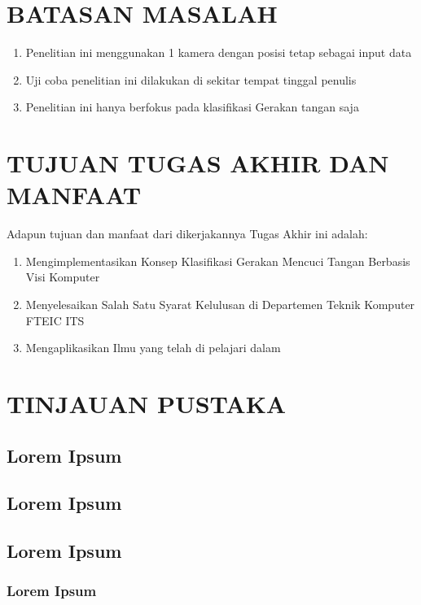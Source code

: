 \documentclass[a4paper]{article}
\begin{document}
\section{BATASAN MASALAH}
\begin{enumerate}
	\item Penelitian ini menggunakan 1 kamera dengan posisi tetap sebagai input data
	\item Uji coba penelitian ini dilakukan di sekitar tempat tinggal penulis
	\item Penelitian ini hanya berfokus pada klasifikasi Gerakan tangan saja
\end{enumerate}

\section{TUJUAN TUGAS AKHIR DAN MANFAAT}
Adapun tujuan dan manfaat dari dikerjakannya Tugas Akhir ini adalah:
\begin{enumerate}
	\item Mengimplementasikan Konsep Klasifikasi Gerakan Mencuci Tangan Berbasis Visi Komputer
	\item Menyelesaikan Salah Satu Syarat Kelulusan di Departemen Teknik Komputer FTEIC ITS
	\item Mengaplikasikan Ilmu yang telah di pelajari dalam
\end{enumerate} 

\section{TINJAUAN PUSTAKA}
\subsection{Lorem Ipsum}
\hspace*{9mm} \lipsum[1]
\subsection{Lorem Ipsum}
\hspace*{9mm} \lipsum[1]
\subsection{Lorem Ipsum}
\subsubsection{Lorem Ipsum}
\hspace*{13mm} \lipsum[1]
\end{document}
